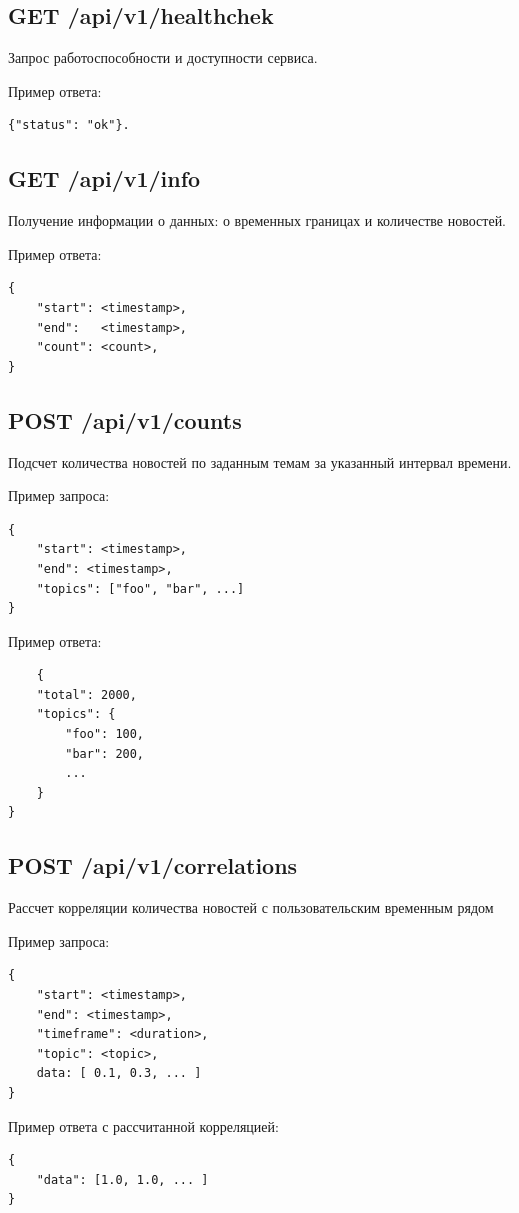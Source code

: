 \subsection{GET /api/v1/healthchek}
Запрос работоспособности и доступности сервиса.

Пример ответа:
\begin{lstlisting}
{"status": "ok"}.
\end{lstlisting}

\subsection{GET /api/v1/info}
Получение информации о данных: о временных границах и количестве новостей.

Пример ответа:
\begin{lstlisting}
{
    "start": <timestamp>,
    "end":   <timestamp>,
    "count": <count>,
}
\end{lstlisting}

\subsection{POST /api/v1/counts}
Подсчет количества новостей по заданным темам за указанный интервал времени.

Пример запроса:
\begin{lstlisting}
{
    "start": <timestamp>,
    "end": <timestamp>,
    "topics": ["foo", "bar", ...]
}
\end{lstlisting}

Пример ответа:
\begin{lstlisting}
    {
    "total": 2000,
    "topics": {
        "foo": 100,
        "bar": 200,
        ...
    }
}
\end{lstlisting}

\subsection{POST /api/v1/correlations}
Рассчет корреляции количества новостей с пользовательским временным рядом

Пример запроса:
\begin{lstlisting}
{
    "start": <timestamp>,
    "end": <timestamp>,
    "timeframe": <duration>,
    "topic": <topic>,
    data: [ 0.1, 0.3, ... ]
}
\end{lstlisting}

Пример ответа с рассчитанной корреляцией:
\begin{lstlisting}
{
    "data": [1.0, 1.0, ... ]
}
\end{lstlisting}

